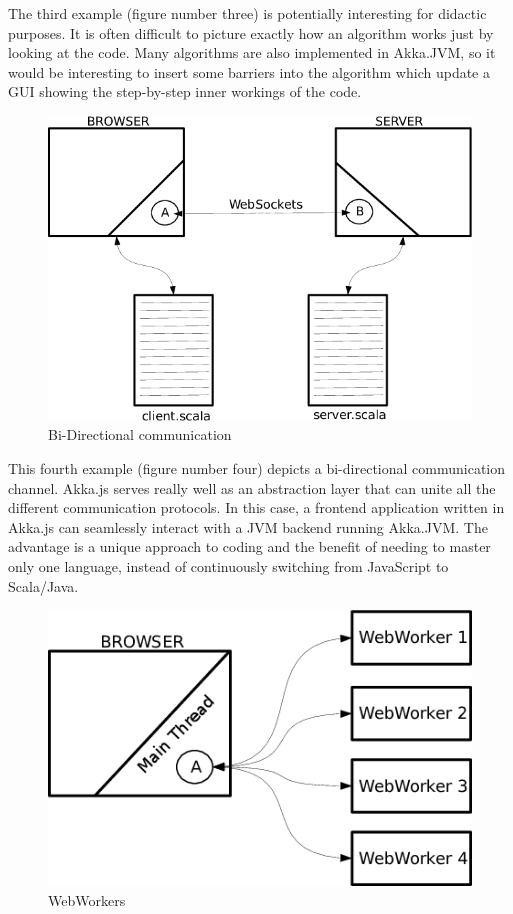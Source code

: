 \documentclass{sig-alternate}
\begin{document}
The third example (figure number three) is potentially interesting for didactic purposes. It is often difficult to picture 
exactly how an algorithm works just by looking at the code. Many algorithms are also implemented
in Akka.JVM, so it would be interesting to insert some barriers into the algorithm which update a 
GUI showing the step-by-step inner workings of the code.

\begin{figure}
\centering
\includegraphics[scale=0.3]{4.png}
\caption{Bi-Directional communication}
\label{fig:communication}
\end{figure}

This fourth example (figure number four) depicts a bi-directional communication channel. Akka.js serves really well as an abstraction layer
that can unite all the different communication protocols. In this case, a frontend application written in Akka.js
can seamlessly interact with a JVM backend running Akka.JVM. The advantage is a unique approach to coding and 
the benefit of needing to master only one language, instead of continuously switching from JavaScript to Scala/Java.

\begin{figure}
\centering
\includegraphics[scale=0.3]{5.png}
\caption{WebWorkers}
\label{fig:ww}
\end{figure}
\end{document}
